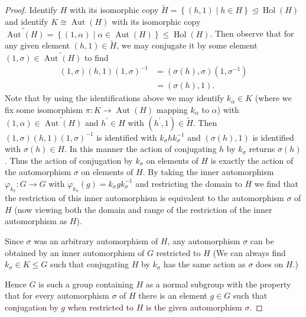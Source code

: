 \documentclass[11pt]{article}
\newcommand{\cbr}[1]{\left\{#1\right\}}
\DeclareMathOperator\Aut{Aut}
\DeclareMathOperator{\Hol}{Hol}
\begin{document}
\begin{enumerate}
\begin{proof}
      Identify $H$ with its isomorphic copy $\widetilde{H} = \cbr{(h,1)\mid h\in H} \unlhd\Hol(H)$ and identify $K\cong \Aut(H)$ with its isomorphic copy $\widetilde{\Aut(H)} = \cbr{(1,\alpha)\mid \alpha \in \Aut(H)} \leq\Hol(H)$. Then observe that for any given element $(h,1)\in \widetilde{H}$, we may conjugate it by some element $(1,\sigma)\in \widetilde{\Aut(H)}$ to find \begin{align*}
        (1,\sigma)(h,1)(1,\sigma)^{-1} &= (\sigma(h), \sigma)(1, \sigma^{-1})\\
        &= (\sigma(h), 1).
      \end{align*} Note that by using the identifications above we may identify $k_\alpha \in K$ (where we fix some isomorphism $\pi\colon K \to \Aut(H)$ mapping $k_\alpha$ to $\alpha$) with $(1,\alpha) \in \widetilde{\Aut(H)}$ and $h^{\prime}\in H$ with $(h^{\prime},1)\in \widetilde{H}$. Then $(1,\sigma)(h,1)(1,\sigma)^{-1}$ is identified with $k_\sigma h k_\sigma^{-1}$ and $(\sigma(h),1)$ is identified with $\sigma(h)\in H$. In this manner the action of conjugating $h$ by $k_\sigma$ returns $\sigma(h)$. Thus the action of conjugation by $k_\sigma$ on elements of $H$ is exactly the action of the automorphism $\sigma$ on elements of $H$. By taking the inner automorphism $\varphi_{k_\sigma}\colon G\to G$ with $\varphi_{k_\sigma}(g) = k_\sigma g k_\sigma^{-1}$ and restricting the domain to $H$ we find that the restriction of this inner automorphism is equivalent to the automorphism $\sigma$ of $H$ (now viewing both the domain and range of the restriction of the inner automorphism as $H$).

      Since $\sigma$ was an arbitrary automorphism of $H$, any automorphism $\sigma$ can be obtained by an inner automorphism of $G$ restricted to $H$ (We can always find $k_\sigma\in K\leq G$ such that conjugating $H$ by $k_\sigma$ has the same action as $\sigma$ does on $H$.)

      Hence $G$ is such a group containing $H$ as a normal subgroup with the property that for every automorphism $\sigma$ of $H$ there is an element $g\in G$ such that conjugation by $g$ when restricted to $H$ is the given automorphism $\sigma$.
    \end{proof}
\end{enumerate}
\end{document}
